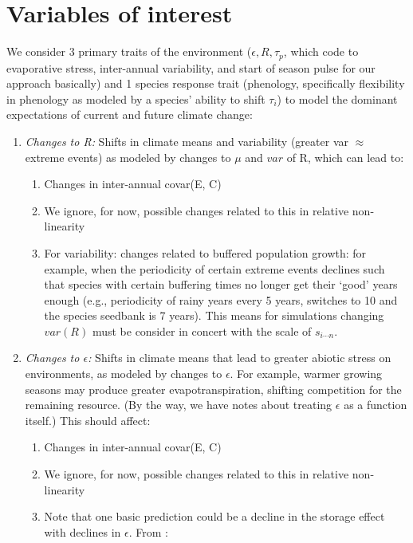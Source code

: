 \documentclass[11pt,a4paper,oneside]{article}
\begin{document}
\section{Variables of interest}
We consider 3 primary traits of the environment (\(\epsilon, R, \tau_{p}\), which
code to evaporative stress, inter-annual variability, and start of season pulse for our approach basically) and 1
species response trait (phenology, specifically flexibility in
phenology as modeled by a species' ability to shift \(\tau_{i}\)) to model
the dominant expectations of current and future climate change:
\begin{enumerate}
\item \emph{Changes to R:} Shifts in climate means and variability (greater var \(\approx\)
  extreme events) as modeled by changes to \(\mu\) and \(var\) of
    R,
  which can lead to:
\begin{enumerate}
\item Changes in inter-annual covar(E, C)
\item We ignore, for now, possible changes related to this in relative non-linearity
\item For variability: changes related to buffered population growth:
  for example, when the periodicity of certain extreme events declines
  such that species with certain buffering times no longer get their
  `good' years enough (e.g., periodicity of rainy years every 5 years,
  switches to 10 and the species seedbank is 7 years). This means for
  simulations changing \(var(R)\) must be consider in concert with the
  scale of \(s_{i\cdots n}\).
\end{enumerate}
\item \emph{Changes to \(\epsilon\):} Shifts in climate means that lead to greater abiotic stress on
  environments, as modeled by changes to  \(\epsilon\). For example,
  warmer growing seasons may produce greater evapotranspiration,
  shifting competition for the remaining resource. (By the way, we
  have notes about treating \(\epsilon\) as a function itself.) This should
  affect:
\begin{enumerate}
\item Changes in inter-annual covar(E, C)
\item We ignore, for now, possible changes related to this in relative non-linearity
\item Note that one basic prediction could be a decline in the storage effect with declines in \(\epsilon\). From \citet{Chesson:2004eo}:
\begin{quote}

\end{quote}
\end{enumerate}
\end{enumerate}
\end{document}
